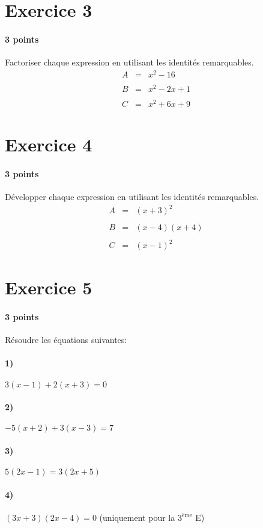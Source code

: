 \documentclass[a4paper]{article}
\begin{document}
  \section*{Exercice 3}
  \paragraph{3 points}
  Factoriser chaque expression en utilisant les identités remarquables.
  \[
    \begin{array}{rcl}
      A &=& x^2 - 16\\\\
      B &=& x^2 - 2x + 1\\\\
      C &=& x^2 + 6x + 9
    \end{array}
  \]

  \section*{Exercice 4}
  \paragraph{3 points}
  Développer chaque expression en utilisant les identités remarquables.
  \[
    \begin{array}{rcl}
      A &=& (x + 3)^2\\\\
      B &=& (x - 4)(x + 4)\\\\
      C &=& (x - 1)^2
    \end{array}
  \]

  \section*{Exercice 5}
  \paragraph{3 points}
  Résoudre les équations suivantes:
  \paragraph{1)} $3(x - 1) + 2(x + 3) = 0$
  \paragraph{2)} $-5(x + 2) + 3(x - 3) = 7$
  \paragraph{3)} $5(2x - 1) = 3(2x + 5)$
  \paragraph{4)} $(3x + 3)(2x - 4) = 0$ \quad (uniquement pour la $3^\text{ème}$ E)
\end{document}

